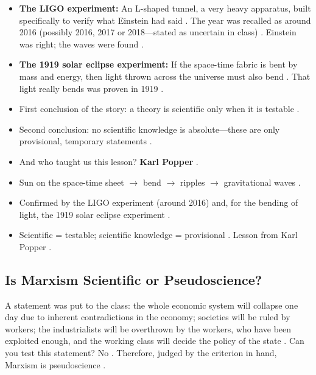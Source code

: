 \begin{DataFact}
\begin{itemize}
    \item \textbf{The LIGO experiment:} An L-shaped tunnel, a very heavy apparatus, built specifically to verify what Einstein had said . The year was recalled as around 2016 (possibly 2016, 2017 or 2018---stated as uncertain in class) . Einstein was right; the waves were found .
    \item \textbf{The 1919 solar eclipse experiment:} If the space-time fabric is bent by mass and energy, then light thrown across the universe must also bend . That light really bends was proven in 1919 .
\end{itemize}
\end{DataFact}

\begin{KeyConcept}
\begin{itemize}
    \item First conclusion of the story: a theory is scientific only when it is testable .
    \item Second conclusion: no scientific knowledge is absolute---these are only provisional, temporary statements .
    \item And who taught us this lesson? \textbf{Karl Popper} .
\end{itemize}
\end{KeyConcept}

\begin{QuickRevision}
\begin{itemize}
    \item Sun on the space-time sheet $\rightarrow$ bend $\rightarrow$ ripples $\rightarrow$ gravitational waves .
    \item Confirmed by the LIGO experiment (around 2016) and, for the bending of light, the 1919 solar eclipse experiment .
    \item Scientific = testable; scientific knowledge = provisional . Lesson from Karl Popper .
\end{itemize}
\end{QuickRevision}

\subsection{Is Marxism Scientific or Pseudoscience?}
A statement was put to the class: the whole economic system will collapse one day due to inherent contradictions in the economy; societies will be ruled by workers; the industrialists will be overthrown by the workers, who have been exploited enough, and the working class will decide the policy of the state . Can you test this statement? No . Therefore, judged by the criterion in hand, Marxism is pseudoscience .

